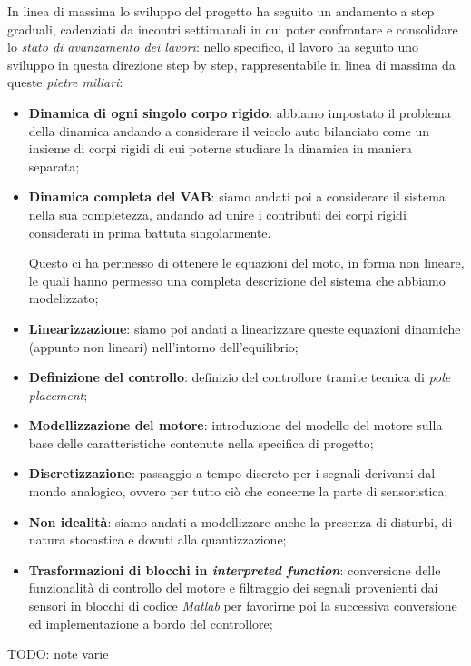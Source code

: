 In linea di massima lo sviluppo del progetto ha seguito un andamento a step graduali, cadenziati da incontri settimanali in cui poter confrontare e consolidare lo \textit{stato di avanzamento dei lavori}: nello specifico, il lavoro ha seguito uno sviluppo in questa direzione step by step, rappresentabile in linea di massima da queste \textit{pietre miliari}:
\begin{itemize}
	\item \textbf{Dinamica di ogni singolo corpo rigido}: abbiamo impostato il problema della dinamica andando a considerare il veicolo auto bilanciato come un insieme di corpi rigidi di cui poterne studiare la dinamica in maniera separata;
	\item \textbf{Dinamica completa del VAB}: siamo andati poi a considerare il sistema nella sua completezza, andando ad unire i contributi dei corpi rigidi considerati in prima battuta singolarmente.
	
	Questo ci ha permesso di ottenere le equazioni del moto, in forma non lineare, le quali hanno permesso una completa descrizione del sistema che abbiamo modelizzato;
	\item \textbf{Linearizzazione}: siamo poi andati a linearizzare queste equazioni dinamiche (appunto non lineari) nell'intorno dell'equilibrio;
	\item \textbf{Definizione del controllo}: definizio del controllore tramite tecnica di \textit{pole placement};
	\item \textbf{Modellizzazione del motore}: introduzione del modello del motore sulla base delle caratteristiche contenute nella specifica di progetto;
	\item \textbf{Discretizzazione}: passaggio a tempo discreto per i segnali derivanti dal mondo analogico, ovvero per tutto ciò che concerne la parte di sensoristica;
	\item \textbf{Non idealità}: siamo andati a modellizzare anche la presenza di disturbi, di natura stocastica e dovuti alla quantizzazione;
	\item \textbf{Trasformazioni di blocchi in \textit{interpreted function}}: conversione delle funzionalità di controllo del motore e filtraggio dei segnali provenienti dai sensori in blocchi di codice \textit{Matlab} per favorirne poi la successiva conversione ed implementazione a bordo del controllore;
\end{itemize}

TODO: note varie
